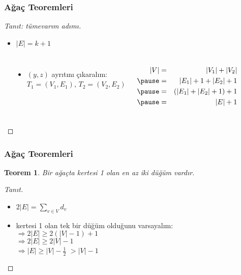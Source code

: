 \documentclass[dvipsnames]{beamer}
\theoremstyle{definition}
\theoremstyle{example}
\theoremstyle{plain}
\newtheorem{teorem}[theorem]{Teorem}
\begin{document}
\begin{frame}
  \frametitle{Ağaç Teoremleri}

  \begin{proof}[Tanıt: tümevarım adımı]
    \begin{itemize}
      \item $|E|=k+1$
    \end{itemize}

    \begin{columns}[t]
      \begin{center}
      \end{center}

      \pause
      \begin{itemize}
        \item $(y,z)$ ayrıtını çıkaralım:\\
          $T_1=(V_1,E_1)$, $T_2=(V_2,E_2)$
      \end{itemize}
      \pause
      \begin{eqnarray*}
        |V| & = & |V_1|+|V_2|\\\pause
            & = & |E_1|+1+|E_2|+1\\\pause
            & = & (|E_1|+|E_2|+1)+1\\\pause
            & = & |E|+1
      \end{eqnarray*}
    \end{columns}
  \end{proof}
\end{frame}

\begin{frame}
  \frametitle{Ağaç Teoremleri}

  \begin{teorem}
    Bir ağaçta kertesi 1 olan en az iki düğüm vardır.
  \end{teorem}

  \pause
  \begin{proof}[Tanıt]
    \begin{itemize}
      \item $2 |E| = \sum_{v \in V} d_v$

      \pause
      \item kertesi 1 olan tek bir düğüm olduğunu varsayalım:\\
        \pause
        $\Rightarrow 2 |E| \geq 2 (|V| - 1) + 1$\\
        \pause
        $\Rightarrow 2 |E| \geq 2 |V| - 1$\\
        \pause
        $\Rightarrow |E| \geq |V| - \frac{1}{2}$
        \pause
        $> |V| - 1$
    \end{itemize}
  \end{proof}
\end{frame}
\end{document}
